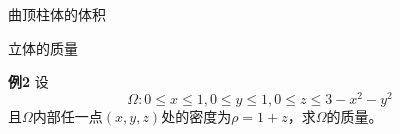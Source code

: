 \begin{frame}{曲顶柱体的体积}
\begin{center}
	\end{center}
\end{frame}

\begin{frame}{立体的质量}
	\linespread{1.2}\pause 
	\begin{exampleblock}{{\bf 例2}\hfill}
		设
		$$\Omega:0\leq x\leq 1,0\leq y\leq 1,0\leq z\leq
		3-x^2-y^2$$
		且$\Omega$内部任一点$(x,y,z)$处的密度为$\rho=1+z$，求$\Omega$的质量。
	\end{exampleblock}
\end{frame}

